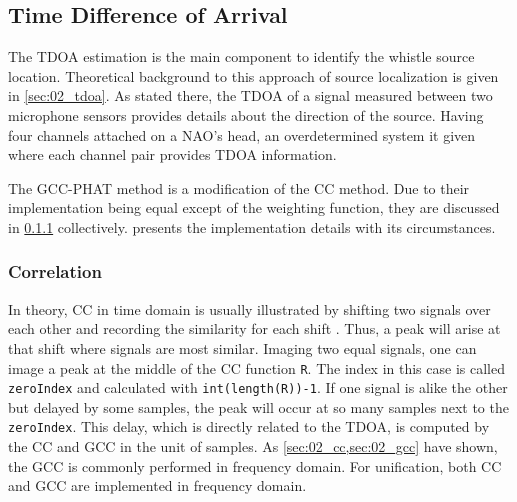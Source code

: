 \subsection{Time Difference of Arrival}
\label{subsec:03_tdoa}

The \ac{TDOA} estimation is the main component to identify the
whistle source location.
Theoretical background to this approach of source localization is
given in \cref{sec:02_tdoa}.
As stated there, the \ac{TDOA} of a signal measured between two microphone sensors
provides details about the direction of the source.
Having four channels attached on a NAO's head, an overdetermined system it
given where each channel pair provides \ac{TDOA} information.

The \ac{GCC-PHAT} method is a modification of the \ac{CC} method.
Due to their implementation being equal except of the weighting function,
they are discussed in \cref{subsubsec:03_cc} collectively.
 presents the implementation details with its
circumstances.

\subsubsection{Correlation}
\label{subsubsec:03_cc}

In theory, \acf{CC} in time domain is usually illustrated by shifting
two signals over each other and recording the similarity for each shift .
Thus, a peak will arise at that shift where signals are most similar.
Imaging two equal signals, one can image a peak at the middle of the \ac{CC} function
\lstinline!R!. 
The index in this case is called \lstinline!zeroIndex! and calculated with
\lstinline!int(length(R))-1!.
If one signal is alike the other but delayed by some samples, the peak will
occur at so many samples next to the \lstinline!zeroIndex!. 
This delay, which is directly related to the \ac{TDOA}, is computed
by the \ac{CC} and \ac{GCC} in the unit of samples.
As \cref{sec:02_cc,sec:02_gcc} have shown, the \ac{GCC} is commonly performed
in frequency domain. 
For unification, both \ac{CC} and \ac{GCC} are implemented in frequency domain.


